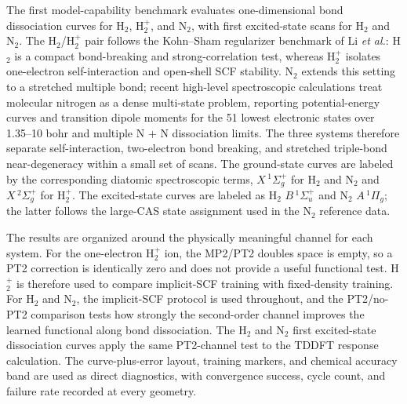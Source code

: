 The first model-capability benchmark evaluates one-dimensional bond
dissociation curves for H$_2$, H$_2^+$, and N$_2$, with first
excited-state scans for H$_2$ and N$_2$. The H$_2$/H$_2^+$
pair follows the Kohn--Sham regularizer benchmark of Li
\emph{et al.}: H$_2$ is a compact bond-breaking and
strong-correlation test, whereas H$_2^+$ isolates one-electron
self-interaction and open-shell SCF stability.\cite{Li2021KohnShamRegularizer}
N$_2$ extends this setting to a stretched multiple bond; recent
high-level spectroscopic calculations treat molecular nitrogen as a
dense multi-state problem, reporting potential-energy curves and
transition dipole moments for the 51 lowest electronic states over
1.35--10 bohr and multiple N + N dissociation
limits.\cite{Hammami2026N2PEC} The three systems therefore separate
self-interaction, two-electron bond breaking, and stretched
triple-bond near-degeneracy within a small set of scans.
The ground-state curves are labeled by the corresponding
diatomic spectroscopic terms, \(X\,{}^1\Sigma_g^+\) for H$_2$
and N$_2$ and \(X\,{}^2\Sigma_g^+\) for H$_2^+$. The excited-state
curves are labeled as H$_2$ \(B\,{}^1\Sigma_u^+\) and N$_2$
\(A\,{}^1\Pi_g\); the latter follows the large-CAS state assignment
used in the N$_2$ reference data.\cite{Hammami2026N2PEC}

The results are organized around the physically meaningful channel for
each system. For the one-electron H$_2^+$ ion, the MP2/PT2 doubles
space is empty, so a PT2 correction is identically zero and does not
provide a useful functional test. H$_2^+$ is therefore used to compare
implicit-SCF training with fixed-density training. For H$_2$ and N$_2$,
the implicit-SCF protocol is used throughout, and the PT2/no-PT2
comparison tests how strongly the second-order channel improves the
learned functional along bond dissociation. The H$_2$ and N$_2$ first
excited-state dissociation curves apply the same PT2-channel test to
the TDDFT response calculation. The curve-plus-error layout, training
markers, and chemical accuracy band are used as direct diagnostics,
with convergence success, cycle count, and failure rate recorded at
every geometry.

